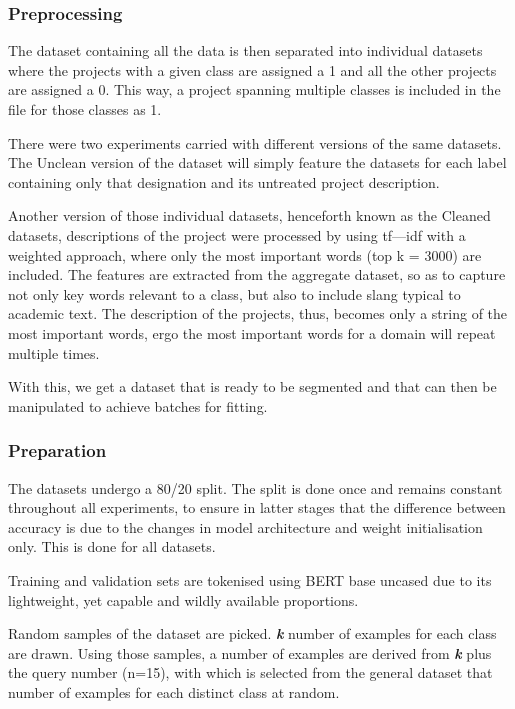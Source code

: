\documentclass[11pt]{article}
\begin{document}
\subsubsection{Preprocessing}

The dataset containing all the data is then separated into individual datasets where the projects with a given class are assigned a 1 and all the other projects are assigned a 0. This way, a project spanning multiple classes is included in the file for those classes as 1.

There were two experiments carried with different versions of the same datasets.
The Unclean
version of the dataset will simply feature the datasets for each label containing only that designation and its untreated project description.

Another version of those individual datasets, henceforth known as the Cleaned datasets, descriptions of the project were processed by using tf---idf\cite{5566113,Yun-tao2005-vn} with a weighted approach, where only the most important words (top k = 3000) are included.
The features are extracted from the aggregate dataset, so as to capture not only key words relevant to a class, but also to include slang typical to academic text.
The description of the projects, thus, becomes only a string of the most important words, ergo the most important words for a domain will repeat multiple times.

With this, we get a dataset that is ready to be segmented and that can then be manipulated to achieve batches for fitting.

\subsubsection{Preparation}
The datasets undergo a 80/20 split. The split is done once and remains constant throughout all experiments, to ensure in latter stages that the 
difference between accuracy is due to the changes in model architecture and weight initialisation only.
This is done for all datasets.

Training and validation sets are tokenised using BERT base uncased\cite{devlin2019bertpretrainingdeepbidirectional} due to its lightweight, yet capable and wildly available proportions.

Random samples of the dataset are picked. \textbf{\textit{k}} number of examples for each class are drawn.
Using those samples, a number of examples are derived
from \textbf{\textit{k}} plus the query number (n=15), with which is selected from the general dataset that number of examples for each distinct class at random.
\end{document}
